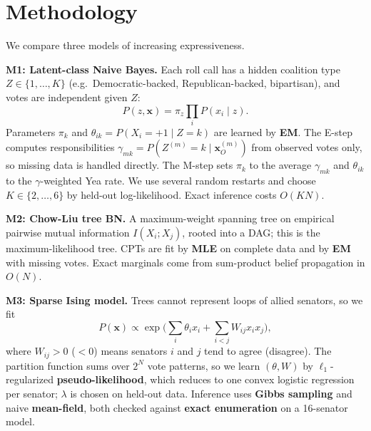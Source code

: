 \documentclass[10pt,twocolumn]{article}
\begin{document}
\section{Methodology}
We compare three models of increasing expressiveness.

\textbf{M1: Latent-class Naive Bayes.} Each roll call has a hidden coalition type $Z\in\{1,\dots,K\}$
(e.g.\ Democratic-backed, Republican-backed, bipartisan), and votes are independent given $Z$:
\[
P(z,\mathbf{x})=\pi_z\textstyle\prod_i P(x_i\mid z).
\]
Parameters $\pi_k$ and $\theta_{ik}=P(X_i{=}{+}1\mid Z{=}k)$ are learned by \textbf{EM}. The E-step
computes responsibilities $\gamma_{mk}=P(Z^{(m)}{=}k\mid\mathbf{x}_O^{(m)})$ from observed votes only, so
missing data is handled directly. The M-step sets $\pi_k$ to the average $\gamma_{mk}$ and $\theta_{ik}$ to the
$\gamma$-weighted Yea rate. We use several random restarts and choose $K\in\{2,\dots,6\}$ by held-out
log-likelihood. Exact inference costs $O(KN)$.

\textbf{M2: Chow-Liu tree BN.} A maximum-weight spanning tree on empirical pairwise mutual information
$I(X_i;X_j)$, rooted into a DAG; this is the maximum-likelihood tree. CPTs are fit by \textbf{MLE} on
complete data and by \textbf{EM} with missing votes. Exact marginals come from sum-product belief
propagation in $O(N)$.

\textbf{M3: Sparse Ising model.} Trees cannot represent loops of allied senators, so we fit
\[
P(\mathbf{x})\propto\exp\Big(\textstyle\sum_i\theta_i x_i+\sum_{i<j}W_{ij}x_ix_j\Big),
\]
where $W_{ij}>0$ ($<0$) means senators $i$ and $j$ tend to agree (disagree). The partition function sums
over $2^N$ vote patterns, so we learn $(\theta,W)$ by $\ell_1$-regularized \textbf{pseudo-likelihood}, which
reduces to one convex logistic regression per senator; $\lambda$ is chosen on held-out data. Inference
uses \textbf{Gibbs sampling} and naive \textbf{mean-field}, both checked against \textbf{exact
enumeration} on a 16-senator model.
\end{document}
